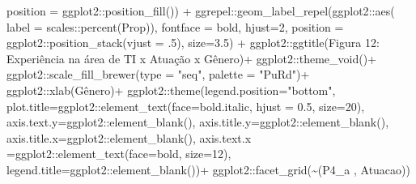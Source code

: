 \documentclass[
]{article}
\newenvironment{Shaded}{\begin{snugshade}}{\end{snugshade}}
\newcommand{\AttributeTok}[1]{\textcolor[rgb]{0.77,0.63,0.00}{#1}}
\newcommand{\DecValTok}[1]{\textcolor[rgb]{0.00,0.00,0.81}{#1}}
\newcommand{\FloatTok}[1]{\textcolor[rgb]{0.00,0.00,0.81}{#1}}
\newcommand{\FunctionTok}[1]{\textcolor[rgb]{0.00,0.00,0.00}{#1}}
\newcommand{\NormalTok}[1]{#1}
\newcommand{\SpecialCharTok}[1]{\textcolor[rgb]{0.00,0.00,0.00}{#1}}
\newcommand{\StringTok}[1]{\textcolor[rgb]{0.31,0.60,0.02}{#1}}
\begin{document}
\begin{Shaded}
\begin{Highlighting}[]
                     \AttributeTok{position =}\NormalTok{ ggplot2}\SpecialCharTok{::}\FunctionTok{position\_fill}\NormalTok{()) }\SpecialCharTok{+}
\NormalTok{  ggrepel}\SpecialCharTok{::}\FunctionTok{geom\_label\_repel}\NormalTok{(ggplot2}\SpecialCharTok{::}\FunctionTok{aes}\NormalTok{(}
    \AttributeTok{label =}\NormalTok{ scales}\SpecialCharTok{::}\FunctionTok{percent}\NormalTok{(Prop)),}
    \AttributeTok{fontface =} \StringTok{\textquotesingle{}bold\textquotesingle{}}\NormalTok{,}
    \AttributeTok{hjust=}\DecValTok{2}\NormalTok{,}
    \AttributeTok{position =}\NormalTok{ ggplot2}\SpecialCharTok{::}\FunctionTok{position\_stack}\NormalTok{(}\AttributeTok{vjust =}\NormalTok{ .}\DecValTok{5}\NormalTok{),}
    \AttributeTok{size=}\FloatTok{3.5}\NormalTok{) }\SpecialCharTok{+}
\NormalTok{  ggplot2}\SpecialCharTok{::}\FunctionTok{ggtitle}\NormalTok{(}\StringTok{\textquotesingle{}Figura 12: Experiência na área de TI x Atuação x Gênero\textquotesingle{}}\NormalTok{)}\SpecialCharTok{+}
\NormalTok{  ggplot2}\SpecialCharTok{::}\FunctionTok{theme\_void}\NormalTok{()}\SpecialCharTok{+}
\NormalTok{  ggplot2}\SpecialCharTok{::}\FunctionTok{scale\_fill\_brewer}\NormalTok{(}\AttributeTok{type =} \StringTok{"seq"}\NormalTok{, }\AttributeTok{palette =} \StringTok{"PuRd"}\NormalTok{)}\SpecialCharTok{+}
\NormalTok{  ggplot2}\SpecialCharTok{::}\FunctionTok{xlab}\NormalTok{(}\StringTok{\textquotesingle{}Gênero\textquotesingle{}}\NormalTok{)}\SpecialCharTok{+}
\NormalTok{  ggplot2}\SpecialCharTok{::}\FunctionTok{theme}\NormalTok{(}\AttributeTok{legend.position=}\StringTok{"bottom"}\NormalTok{,}
                 \AttributeTok{plot.title=}\NormalTok{ggplot2}\SpecialCharTok{::}\FunctionTok{element\_text}\NormalTok{(}\AttributeTok{face=}\StringTok{\textquotesingle{}bold.italic\textquotesingle{}}\NormalTok{,}
                                                  \AttributeTok{hjust =} \FloatTok{0.5}\NormalTok{, }\AttributeTok{size=}\DecValTok{20}\NormalTok{),}
                 \AttributeTok{axis.text.y=}\NormalTok{ggplot2}\SpecialCharTok{::}\FunctionTok{element\_blank}\NormalTok{(),}
                 \AttributeTok{axis.title.y=}\NormalTok{ggplot2}\SpecialCharTok{::}\FunctionTok{element\_blank}\NormalTok{(),}
                 \AttributeTok{axis.title.x=}\NormalTok{ggplot2}\SpecialCharTok{::}\FunctionTok{element\_blank}\NormalTok{(),}
                 \AttributeTok{axis.text.x =}\NormalTok{ggplot2}\SpecialCharTok{::}\FunctionTok{element\_text}\NormalTok{(}\AttributeTok{face=}\StringTok{\textquotesingle{}bold\textquotesingle{}}\NormalTok{, }\AttributeTok{size=}\DecValTok{12}\NormalTok{),}
                 \AttributeTok{legend.title=}\NormalTok{ggplot2}\SpecialCharTok{::}\FunctionTok{element\_blank}\NormalTok{())}\SpecialCharTok{+}
\NormalTok{  ggplot2}\SpecialCharTok{::}\FunctionTok{facet\_grid}\NormalTok{(}\SpecialCharTok{\textasciitilde{}}\StringTok{\textasciigrave{}}\AttributeTok{(\textquotesingle{}P4\_a \textquotesingle{}, \textquotesingle{}Atuacao\textquotesingle{})}\StringTok{\textasciigrave{}}\NormalTok{)}
\end{Highlighting}
\end{Shaded}
\end{document}
